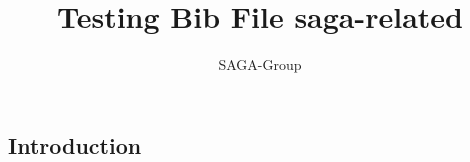\documentclass[a4paper,10pt]{article}
\newcommand{\jhanote}[1]{  {\textcolor{red}     { ***Shantenu: #1 }}}
\newcommand{\jhanote}[1]{}
\begin{document}
 \title{ \Large \vspace{-3.5em} Testing Bib File saga-related }
 
 \author{ SAGA-Group
 }
 \date{}
 \maketitle
 




\subsection*{Introduction}
\end{document}
